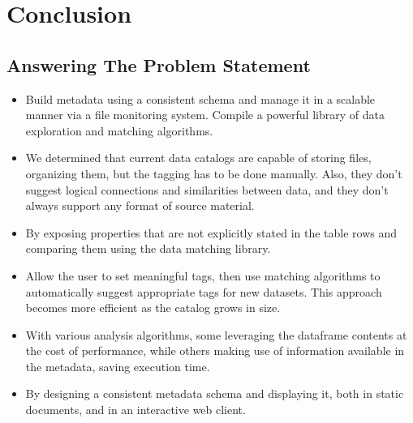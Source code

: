 \chapter{Conclusion}\label{ch:conclusion}

\section{Answering The Problem Statement}

\begin{itemize}
    \item {} \newline
    Build metadata using a consistent schema and manage it in a scalable manner via a file monitoring system.
    Compile a powerful library of data exploration and matching algorithms.
    \item {} \newline
    We determined that current data catalogs are capable of storing files, organizing them, but the tagging has to be done manually.
    Also, they don't suggest logical connections and similarities between data, and they don't always support any format of
    source material.
    \item {} \newline
    By exposing properties that are not explicitly stated in the table rows and comparing them using the data matching library.
    \item {} \newline
    Allow the user to set meaningful tags, then use matching algorithms to automatically suggest appropriate tags for new
    datasets.
    This approach becomes more efficient as the catalog grows in size.
    \item {} \newline
    With various analysis algorithms, some leveraging the dataframe contents at the cost of performance, while others making
    use of information available in the metadata, saving execution time.
    \item {} \newline
    By designing a consistent metadata schema and displaying it, both in static documents, and in an interactive web client.
\end{itemize}



